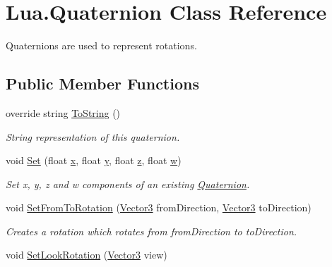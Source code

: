 \hypertarget{class_lua_1_1_quaternion}{}\section{Lua.\+Quaternion Class Reference}
\label{class_lua_1_1_quaternion}


Quaternions are used to represent rotations.  


\subsection*{Public Member Functions}
\begin{DoxyCompactItemize}
\item 
override string \mbox{\hyperlink{class_lua_1_1_quaternion_a72a4b219c3442e088c7ee963feb1b372}{To\+String}} ()
\begin{DoxyCompactList}\small\item\em String representation of this quaternion. \end{DoxyCompactList}\item 
void \mbox{\hyperlink{class_lua_1_1_quaternion_a0cb037e26892fa50a048fc751f7f017a}{Set}} (float \mbox{\hyperlink{class_lua_1_1_quaternion_aefb405b7fafa79708a6d8120781debce}{x}}, float \mbox{\hyperlink{class_lua_1_1_quaternion_ab7eb002a81cfc537a9c3afc8965ef2ec}{y}}, float \mbox{\hyperlink{class_lua_1_1_quaternion_ac26c0a2710dd86783dee62c8645ee55c}{z}}, float \mbox{\hyperlink{class_lua_1_1_quaternion_a4a66f5c598907b4d906b0c5dd0e28526}{w}})
\begin{DoxyCompactList}\small\item\em Set x, y, z and w components of an existing \mbox{\hyperlink{class_lua_1_1_quaternion}{Quaternion}}. \end{DoxyCompactList}\item 
void \mbox{\hyperlink{class_lua_1_1_quaternion_aa7991983472a41d5d7c1b7cb61eb5580}{Set\+From\+To\+Rotation}} (\mbox{\hyperlink{class_lua_1_1_vector3}{Vector3}} from\+Direction, \mbox{\hyperlink{class_lua_1_1_vector3}{Vector3}} to\+Direction)
\begin{DoxyCompactList}\small\item\em Creates a rotation which rotates from from\+Direction to to\+Direction. \end{DoxyCompactList}\item 
void \mbox{\hyperlink{class_lua_1_1_quaternion_aab942db162b73214d4b563bd6a49bad4}{Set\+Look\+Rotation}} (\mbox{\hyperlink{class_lua_1_1_vector3}{Vector3}} view)

\end{DoxyCompactItemize}
